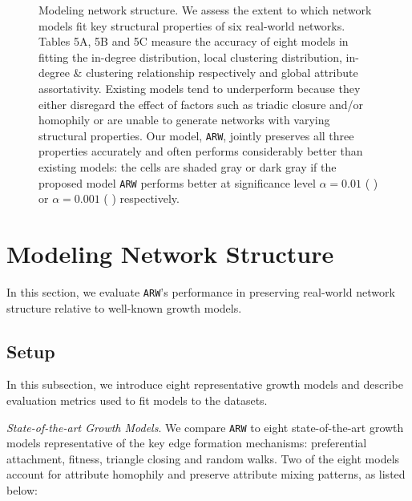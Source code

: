 
\begin{figure*}[t]
	\vspace{-15pt}
	\centering
	\vspace{-16pt}
	\caption{
		Modeling network structure. We assess the extent to which network models
		fit key structural properties of six real-world networks. Tables 5A, 5B and 5C
		measure the accuracy of eight models in fitting the in-degree distribution,
		local clustering distribution, in-degree \& clustering relationship
		respectively and global attribute assortativity.
		Existing models tend to underperform because they either disregard
		the effect of factors such as triadic closure and/or homophily
		or are unable to generate networks with varying structural properties.
		Our model, \texttt{ARW}, jointly preserves all three properties accurately and often
		performs considerably better than existing models:
		the cells are shaded gray or dark gray if the proposed model \texttt{ARW} performs
		better at significance level $\alpha=0.01$ ( \lightgraybg{ }) or $\alpha=0.001$ ( \darkgraybg{ })
		respectively.
	}
	\vspace{-10pt}
	\label{fig:exp_table}
\end{figure*}

\section{Modeling Network Structure}
\label{sec:Experiments}
In this section, we evaluate \texttt{ARW}'s performance in preserving
real-world network structure relative to well-known growth models.

\subsection{Setup}
\label{sub:Experimental Setup}

In this subsection, we introduce eight representative growth models
and describe evaluation metrics used to fit models to the datasets.

\textit{State-of-the-art Growth Models}. We compare \texttt{ARW} to eight state-of-the-art
growth models representative of the key edge formation
mechanisms: preferential attachment, fitness, triangle closing and random walks.
Two of the eight models account for attribute homophily and preserve attribute mixing patterns,
as listed below:

